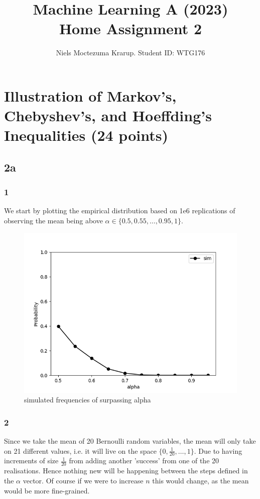 \documentclass[a4paper,12pt]{article}
\begin{document}
\title{Machine Learning A (2023)\\Home Assignment 2}
\author{\color{red}Niels Moctezuma Krarup. Student ID: WTG176}
\date{}
\maketitle

\tableofcontents %
\newpage %

\section{Illustration of Markov's, Chebyshev's, and Hoeffding's Inequalities (24 points)}

\subsection*{2a}
\subsubsection*{1}
We start by plotting the empirical distribution based on 1e6 replications of observing the mean being above $\alpha \in \{0.5, 0.55,\dots , 0.95, 1\}$.

\begin{figure}[htbp]
    \centering
    \includegraphics[width=0.5\linewidth]{HA2_2a_1.png}
    \caption{simulated frequencies of surpassing alpha} %
    \label{fig:1}
\end{figure}



\subsubsection*{2}
Since we take the mean of 20 Bernoulli random variables, the mean will only take on 21 different values, i.e. it will live on the space $\{0, \frac{1}{20},\dots , 1\}$. Due to having increments of size $\frac{1}{20}$ from adding another 'success' from one of the 20 realisations. Hence nothing new will be happening between the steps defined in the $\alpha$ vector. Of course if we were to increase $n$ this would change, as the mean would be more fine-grained.
\end{document}
